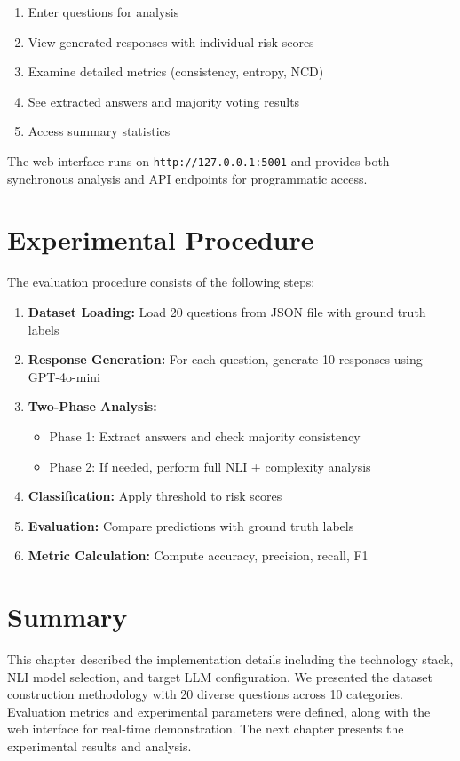 \begin{enumerate}
    \item Enter questions for analysis
    \item View generated responses with individual risk scores
    \item Examine detailed metrics (consistency, entropy, NCD)
    \item See extracted answers and majority voting results
    \item Access summary statistics
\end{enumerate}

The web interface runs on \texttt{http://127.0.0.1:5001} and provides both synchronous analysis and API endpoints for programmatic access.

\section{Experimental Procedure}

The evaluation procedure consists of the following steps:

\begin{enumerate}
    \item \textbf{Dataset Loading:} Load 20 questions from JSON file with ground truth labels
    \item \textbf{Response Generation:} For each question, generate 10 responses using GPT-4o-mini
    \item \textbf{Two-Phase Analysis:}
    \begin{itemize}
        \item Phase 1: Extract answers and check majority consistency
        \item Phase 2: If needed, perform full NLI + complexity analysis
    \end{itemize}
    \item \textbf{Classification:} Apply threshold to risk scores
    \item \textbf{Evaluation:} Compare predictions with ground truth labels
    \item \textbf{Metric Calculation:} Compute accuracy, precision, recall, F1
\end{enumerate}

\section{Summary}

This chapter described the implementation details including the technology stack, NLI model selection, and target LLM configuration. We presented the dataset construction methodology with 20 diverse questions across 10 categories. Evaluation metrics and experimental parameters were defined, along with the web interface for real-time demonstration. The next chapter presents the experimental results and analysis.
